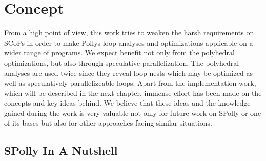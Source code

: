 
\chapter{Concept} %
\label{Chapter3}

From a high point of view, this work tries to weaken the harsh requirements on 
SCoPs in order to make Pollys loop analyses and optimizations applicable on a 
wider range of programs. We expect benefit not only from the polyhedral 
optimizations, but also through speculative parallelization. The polyhedral 
analyses are used twice since they reveal loop nests which may be optimized as 
well as speculatively parallelizeable loops. 
Apart from the implementation work, which will be described in the 
next chapter, immense effort has been made on the concepts and key ideas behind.
We believe that these ideas and the knowledge gained during the work is very 
valuable not only for future work on SPolly or one of its bases but also for
other approaches facing similar situations.


\section{SPolly In A Nutshell}

